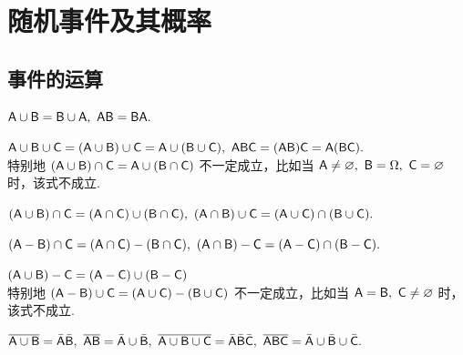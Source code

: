 \section{随机事件及其概率}

\subsection{事件的运算}

\begin{theorem}[交换律]
    $\mathsf{A} \cup \mathsf{B}=\mathsf{B} \cup \mathsf{A},~\mathsf{A} \mathsf{B}=\mathsf{B} \mathsf{A} .$
\end{theorem}

\begin{theorem}[结合律]
    $\mathsf{A} \cup \mathsf{B} \cup \mathsf{C}=(\mathsf{A} \cup \mathsf{B}) \cup \mathsf{C}=\mathsf{A} \cup(\mathsf{B} \cup \mathsf{C}),~\mathsf{A} \mathsf{B} \mathsf{C}=(\mathsf{A} \mathsf{B}) \mathsf{C}=\mathsf{A}(\mathsf{B} \mathsf{C}) .$\\
    特别地 $(\mathsf{A} \cup \mathsf{B}) \cap \mathsf{C}=\mathsf{A} \cup(\mathsf{B} \cap \mathsf{C})$ 不一定成立，比如当 $ \mathsf{A} \neq \varnothing,~\mathsf{B}=\Omega,~\mathsf{C}=\varnothing $ 时，该式不成立.
\end{theorem}

\begin{theorem}[和与积的分配律]
    $(\mathsf{A} \cup \mathsf{B}) \cap \mathsf{C}=(\mathsf{A} \cap \mathsf{C}) \cup(\mathsf{B} \cap \mathsf{C}),~(\mathsf{A} \cap \mathsf{B}) \cup \mathsf{C}=(\mathsf{A} \cup \mathsf{C}) \cap(\mathsf{B} \cup \mathsf{C}) .$
\end{theorem}

\begin{theorem}[差与积的分配律]
    $(\mathsf{A}-\mathsf{B}) \cap \mathsf{C}=(\mathsf{A} \cap \mathsf{C})-(\mathsf{B} \cap \mathsf{C}),~(\mathsf{A} \cap \mathsf{B})-\mathsf{C}=(\mathsf{A}-\mathsf{C}) \cap(\mathsf{B}-\mathsf{C}) .$
\end{theorem}

\begin{theorem}[和与差的分配律]
    $(\mathsf{A} \cup \mathsf{B})-\mathsf{C}=(\mathsf{A}-\mathsf{C}) \cup(\mathsf{B}-\mathsf{C})$\\
    特别地 $(\mathsf{A}-\mathsf{B}) \cup \mathsf{C}=(\mathsf{A} \cup \mathsf{C})-(\mathsf{B} \cup \mathsf{C})$ 不一定成立，比如当 $ \mathsf{A}=\mathsf{B},~\mathsf{C} \neq \varnothing $ 时，该式不成立.
\end{theorem}

\begin{theorem}[对偶律]
    $\overline{\mathsf{A} \cup \mathsf{B}}=\bar{\mathsf{A}} \bar{\mathsf{B}},~\overline{\mathsf{A} \mathsf{B}}=\bar{\mathsf{A}} \cup \bar{\mathsf{B}},~\overline{\mathsf{A} \cup \mathsf{B} \cup \mathsf{C}}=\bar{\mathsf{A}} \bar{\mathsf{B}} \bar{\mathsf{C}},~\overline{\mathsf{A} \mathsf{B} \mathsf{C}}=\bar{\mathsf{A}} \cup \bar{\mathsf{B}} \cup \bar{\mathsf{C}} .$
\end{theorem}

